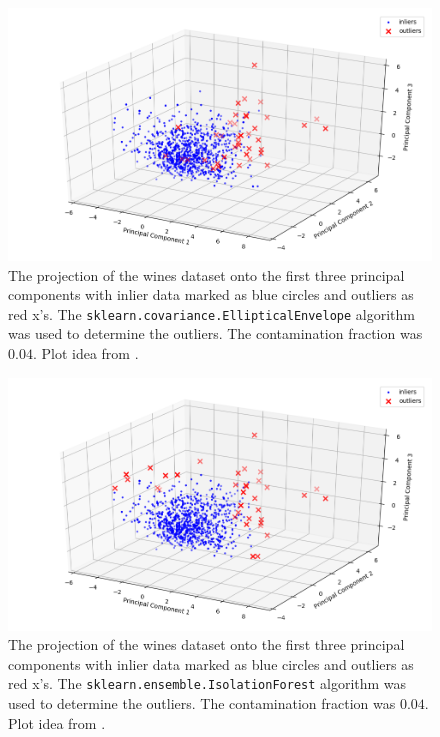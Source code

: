 \documentclass[12pt,preprint]{aastex61}
\begin{document}
 \begin{figure}
 \centering 
 \includegraphics[angle=0,width=130mm]{../output/outlierPCA_3D_ell.png}
 \caption{
   The projection of the wines dataset onto the first three principal components with
   inlier data marked as blue circles and outliers as red x's. The
   \texttt{sklearn.covariance.EllipticalEnvelope} algorithm was used to determine the
   outliers. The contamination fraction was $0.04$. Plot idea from \citealp{Sawtelle_2017}.
 \label{FIG-Ell-Outliers-PCA-3D}}
 \end{figure}

 \begin{figure}
 \centering 
 \includegraphics[angle=0,width=130mm]{../output/outlierPCA_3D_iforest.png}
 \caption{
   The projection of the wines dataset onto the first three principal components with
   inlier data marked as blue circles and outliers as red x's. The
   \texttt{sklearn.ensemble.IsolationForest} algorithm was used to determine the
   outliers. The contamination fraction was $0.04$. Plot idea from \citealp{Sawtelle_2017}.
 \label{FIG-iForest-Outliers-PCA-3D}}
 \end{figure}
\end{document}
